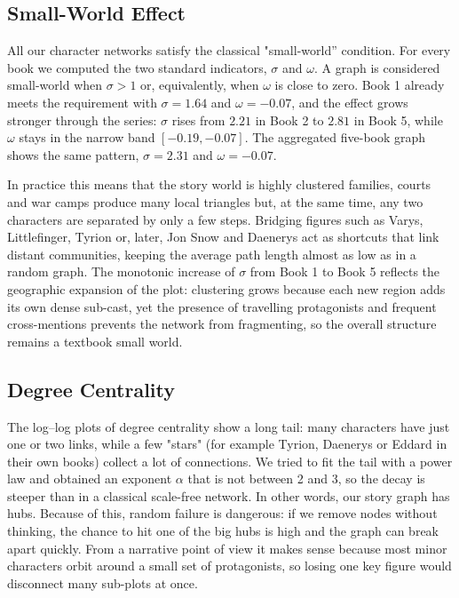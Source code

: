 \documentclass[12pt, a4paper]{article}
\begin{document}
\subsection*{Small-World Effect} 

All our character networks satisfy the classical "small-world'' condition.
For every book we computed the two standard indicators, 
$\sigma$ and $\omega$.
A graph is considered small-world when $\sigma>1$ or, equivalently, when $\omega$ is close to zero.
Book 1 already meets the requirement with $\sigma=1.64$ and $\omega=-0.07$, and the effect grows stronger through the series: $\sigma$ rises from $2.21$ in Book 2 to $2.81$ in Book 5, while $\omega$ stays in the narrow band $[-0.19,-0.07]$.
The aggregated five-book graph shows the same pattern, $\sigma=2.31$ and $\omega=-0.07$.

In practice this means that the story world is highly clustered families, 
courts and war camps produce many local triangles but, at the same time, 
any two characters are separated by only a few steps. 
Bridging figures such as Varys, Littlefinger, 
Tyrion or, later, Jon Snow and Daenerys act as 
shortcuts that link distant communities, keeping the average path length almost as low 
as in a random graph.  The monotonic increase of $\sigma$ from Book 1 to Book 5 reflects
 the geographic expansion of the plot: clustering grows because each new region adds its
  own dense sub-cast, yet the presence of travelling protagonists and frequent cross-mentions
   prevents the network from fragmenting, so the overall structure remains a textbook small world.


\subsection*{Degree Centrality} 
The log–log plots of degree centrality show a long tail: many characters have just one or two links, while a few "stars" (for example Tyrion, Daenerys or Eddard in their own books) collect a lot of connections.
We tried to fit the tail with a power law and obtained an exponent $\alpha$ that is not between 2 and 3, so the decay is steeper than in a classical scale-free network. In other words, our story graph has hubs. Because of this, random failure is dangerous: if we remove nodes without thinking, the chance to hit one of the big hubs is high and the graph can break apart quickly. From a narrative point of view it makes sense because most minor characters orbit around a small set of protagonists, so losing one key figure would disconnect many sub-plots at once.
\end{document}
